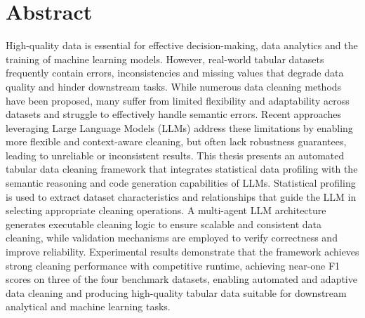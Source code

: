 \chapter*{Abstract}
High-quality data is essential for effective decision-making, data analytics and the training of machine learning models. 
However, real-world tabular datasets frequently contain errors, inconsistencies and missing values that degrade data quality and hinder downstream tasks. 
While numerous data cleaning methods have been proposed, many suffer from limited flexibility and adaptability across datasets and struggle to effectively handle semantic errors. 
Recent approaches leveraging Large Language Models (LLMs) address these limitations by enabling more flexible and context-aware cleaning, but often lack robustness guarantees, leading to unreliable or inconsistent results. 
This thesis presents an automated tabular data cleaning framework that integrates statistical data profiling with the semantic reasoning and code generation capabilities of LLMs. 
Statistical profiling is used to extract dataset characteristics and relationships that guide the LLM in selecting appropriate cleaning operations. 
A multi-agent LLM architecture generates executable cleaning logic to ensure scalable and consistent data cleaning, while validation mechanisms are employed to verify correctness and improve reliability. 
Experimental results demonstrate that the framework achieves strong cleaning performance with competitive runtime, achieving near-one F1 scores on three of the four benchmark datasets, enabling automated and adaptive data cleaning and producing high-quality tabular data suitable for downstream analytical and machine learning tasks.